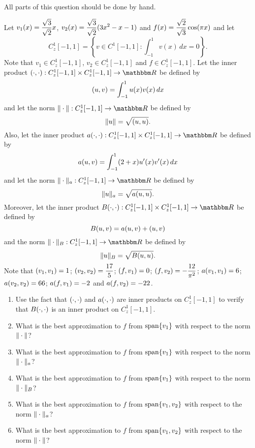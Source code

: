 All parts of this question should be done by hand.

Let $\displaystyle{v_1(x)={\sqrt{3} \over \sqrt{2}}x}$, $\displaystyle{v_2(x)={\sqrt{3} \over \sqrt{2}}(3x^2-x-1)}$ and $\displaystyle{f(x)={\sqrt{2} \over \sqrt{3}}\cos(\pi x)}$ and let
\[
C_z^1[-1,1]=\left\{v\in C^1[-1,1]:\int_{-1}^1v(x)\,dx=0\right\}.
\]
Note that $v_1\in C_z^1[-1,1]$, $v_2\in C_z^1[-1,1]$ and $f\in C_z^1[-1,1]$. Let the inner product $\ip{\cdot,\cdot}:C_z^1[-1,1]\times C_z^1[-1,1]\to\R$ be defined by
\[
(u,v)=\int_{-1}^1u(x)v(x)\,dx
\]
and let the norm $\norm{\cdot}:C_z^1[-1,1]\to\R$ be defined by
\[
\|u\|=\sqrt{(u,u)}.
\]
Also, let the inner product $a\ip{\cdot,\cdot}:C_z^1[-1,1]\times C_z^1[-1,1]\to\R$ be defined by
\[
a(u,v)=\int_{-1}^1(2+x)u'(x)v'(x)\,dx
\]
and let the norm $\norm{\cdot}_a:C_z^1[-1,1]\to\R$ be defined by
\[
\|u\|_a=\sqrt{a(u,u)}.
\]
Moreover, let the inner product $B\ip{\cdot,\cdot}:C_z^1[-1,1]\times C_z^1[-1,1]\to\R$ be defined by
\[
B(u,v)=a(u,v)+(u,v)
\]
and the norm $\norm{\cdot}_B:C_z^1[-1,1]\to\R$ be defined by
\[
\|u\|_B=\sqrt{B(u,u)}.
\]
Note that $(v_1,v_1)=1$; $(v_2,v_2)=\displaystyle{{17 \over 5}}$; $(f,v_1)=0$; $\displaystyle{(f,v_2)=-{12 \over \pi^2}}$; $a(v_1,v_1)=6$; $a(v_2,v_2)=66$; $a(f,v_1)=-2$ and $a(f,v_2)=-22$.
\begin{enumerate}
\item Use the fact that $(\cdot,\cdot)$ and $a(\cdot,\cdot)$ are inner products on $C_z^1[-1,1]$ to verify that $B(\cdot,\cdot)$ is an inner product on $C_z^1[-1,1]$.
\\
\item What is the best approximation to $f$ from ${\rm span}\{v_1\}$ with respect to the norm $\|\cdot\|$?
\\
\item What is the best approximation to $f$ from ${\rm span}\{v_1\}$ with respect to the norm $\|\cdot\|_a$?
\\
\item What is the best approximation to $f$ from ${\rm span}\{v_1\}$ with respect to the norm $\|\cdot\|_B$?
\\
\item What is the best approximation to $f$ from ${\rm span}\{v_1,v_2\}$ with respect to the norm $\|\cdot\|_a$?
\\
\item What is the best approximation to $f$ from ${\rm span}\{v_1,v_2\}$ with respect to the norm $\|\cdot\|$?
\end{enumerate}





